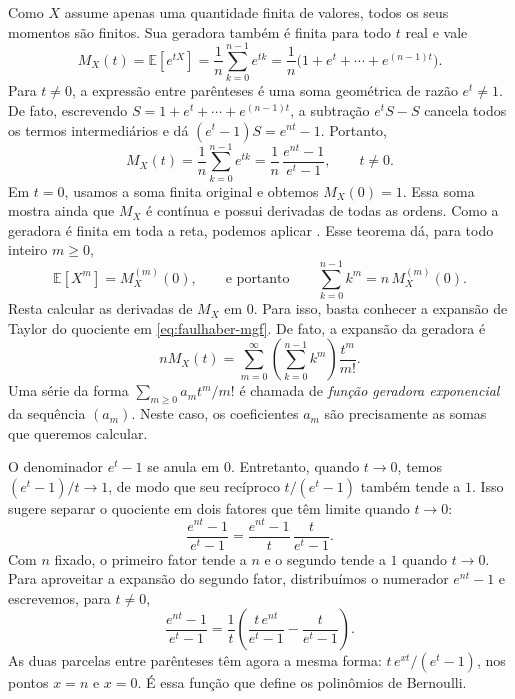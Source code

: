 \documentclass[12pt,portuguese]{article}
\theoremstyle{definition}
\theoremstyle{plainexercise}
\theoremstyle{starredexercise}
\theoremstyle{definition}
\begin{document}
Como $X$ assume apenas uma quantidade finita de valores, todos os seus
momentos são finitos. Sua geradora também é finita para todo $t$ real e
vale
\[
M_X(t)=\mathbb{E}[e^{tX}]=\frac1n\sum_{k=0}^{n-1}e^{tk}
=\frac1n\bigl(1+e^t+\cdots+e^{(n-1)t}\bigr).
\]
Para $t\neq0$, a expressão entre parênteses é uma soma geométrica de
razão $e^t\neq1$. De fato, escrevendo $S=1+e^t+\cdots+e^{(n-1)t}$,
a subtração $e^tS-S$ cancela todos os termos intermediários e dá
$(e^t-1)S=e^{nt}-1$. Portanto,
\begin{equation}\label{eq:faulhaber-mgf}
M_X(t)=\frac1n\sum_{k=0}^{n-1}e^{tk}
=\frac1n\,\frac{e^{nt}-1}{e^{t}-1},\qquad t\neq0.
\end{equation}
Em $t=0$, usamos a soma finita original e obtemos $M_X(0)=1$.
Essa soma mostra ainda que $M_X$ é contínua e possui derivadas de todas
as ordens. Como a geradora é finita em toda a reta, podemos aplicar
. Esse teorema dá, para
todo inteiro $m\geqslant0$,
\begin{equation}\label{eq:faulhaber-momento}
\mathbb{E}[X^{m}]=M_X^{(m)}(0),
\qquad\text{e portanto}\qquad
\sum_{k=0}^{n-1}k^{m}=n\,M_X^{(m)}(0).
\end{equation}
Resta calcular as derivadas de $M_X$ em $0$. Para isso, basta conhecer a
expansão de Taylor do quociente em \eqref{eq:faulhaber-mgf}.
De fato, a expansão da geradora é
\[
nM_X(t)=\sum_{m=0}^{\infty}
\left(\sum_{k=0}^{n-1}k^m\right)\frac{t^m}{m!}.
\]
Uma série da forma $\sum_{m\geqslant0}a_m t^m/m!$ é chamada de
\emph{função geradora exponencial} da sequência $(a_m)$. Neste caso,
os coeficientes $a_m$ são precisamente as somas que queremos calcular.

O denominador $e^t-1$ se anula em $0$. Entretanto, quando $t\to0$,
temos $(e^t-1)/t\to1$, de modo que seu recíproco $t/(e^t-1)$ também
tende a $1$. Isso sugere separar o quociente em dois fatores que têm
limite quando $t\to0$:
\[
\frac{e^{nt}-1}{e^t-1}
=\frac{e^{nt}-1}{t}\,\frac{t}{e^t-1}.
\]
Com $n$ fixado, o primeiro fator tende a $n$ e o segundo tende a $1$
quando $t\to0$.
Para aproveitar a expansão do segundo fator, distribuímos o numerador
$e^{nt}-1$ e escrevemos, para $t\neq0$,
\[
\frac{e^{nt}-1}{e^{t}-1}
=\frac{1}{t}\left(\frac{t\,e^{nt}}{e^{t}-1}
-\frac{t}{e^{t}-1}\right).
\]
As duas parcelas entre parênteses têm agora a mesma forma:
$t\,e^{xt}/(e^{t}-1)$, nos pontos $x=n$ e $x=0$. É essa função que define os
polinômios de Bernoulli.
\end{document}
